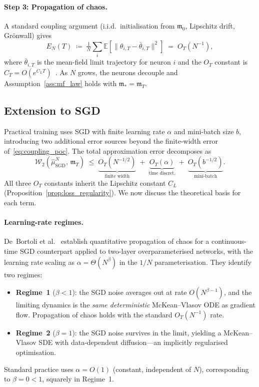 \documentclass[11pt]{article}
\newcommand{\E}{\mathbb{E}}
\newcommand{\cW}{\mathcal{W}}
\begin{document}
\paragraph{Step 3: Propagation of chaos.}
A standard coupling argument (i.i.d.\ initialisation from
$\mathfrak{m}_0$, Lipschitz drift, Gr\"{o}nwall) gives
\begin{equation}\label{eq:coupling_poc}
  E_N(T)
  \;\coloneqq\;
  \tfrac{1}{N}\sum_i\E[\|\theta_{i,T}-\bar\theta_{i,T}\|^2]
  \;=\; O_T(N^{-1}),
\end{equation}
where $\bar\theta_{i,T}$ is the mean-field limit trajectory for
neuron $i$ and the $O_T$ constant is
$C_T = O(e^{C_L T})$~\cite{mei2018meanfield,rotskoff2022}.
As $N$ grows, the neurons decouple and
Assumption~\ref{ass:mf_law} holds with $\mathfrak{m}_* = \mathfrak{m}_T$.

\subsection{Extension to SGD}\label{app:mf_sgd}

Practical training uses SGD with finite learning rate $\alpha$ and
mini-batch size $b$, introducing two additional error sources beyond
the finite-width error of~\eqref{eq:coupling_poc}.
The total approximation error decomposes as
\begin{equation}\label{eq:sgd_error}
  \cW_2(\hat\mu_{\mathrm{SGD}}^N,\,\mathfrak{m}_T)
  \;\le\;
  \underbrace{O_T(N^{-1/2})}_{\text{finite width}}
  \;+\; \underbrace{O_T(\alpha)}_{\text{time discret.}}
  \;+\; \underbrace{O_T(b^{-1/2})}_{\text{mini-batch}}.
\end{equation}
All three $O_T$ constants inherit the Lipschitz
constant $C_L$ (Proposition~\ref{prop:loss_regularity}).
We now discuss the theoretical basis for each term.

\paragraph{Learning-rate regimes.}
De~Bortoli et al.~\cite{debortoli2020} establish quantitative
propagation of chaos for a continuous-time SGD counterpart applied to
two-layer overparameterised networks, with the learning rate scaling
as $\alpha = \Theta(N^\beta)$ in the $1/N$ parameterisation.
They identify two regimes:
\begin{itemize}[itemsep=2pt]
  \item \textbf{Regime~1} ($\beta < 1$):
    the SGD noise averages out at rate $O(N^{\beta-1})$, and the
    limiting dynamics is the \emph{same deterministic}
    McKean--Vlasov ODE as gradient flow.
    Propagation of chaos holds with the standard $O_T(N^{-1})$ rate.
  \item \textbf{Regime~2} ($\beta = 1$):
    the SGD noise survives in the limit, yielding a
    McKean--Vlasov SDE with data-dependent diffusion---an implicitly
    regularised optimisation.
\end{itemize}
Standard practice uses $\alpha = O(1)$ (constant, independent of $N$),
corresponding to $\beta = 0 < 1$, squarely in Regime~1.
\end{document}
